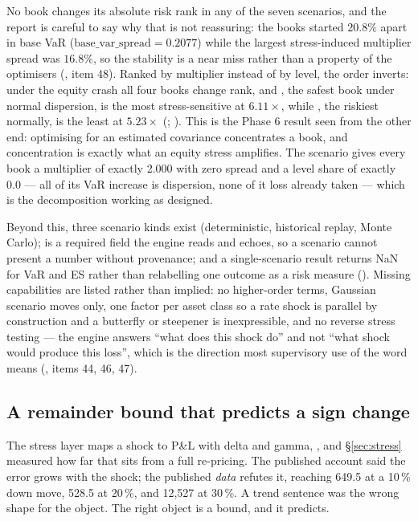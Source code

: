 \documentclass[11pt,a4paper]{article}
\begin{document}
No book changes its absolute risk rank in any of the seven scenarios, and the report is careful
to say why that is not reassuring: the books started $20.8\%$ apart in base VaR
($\text{base\_var\_spread} = 0.2077$) while the largest stress-induced multiplier spread was
$16.8\%$, so the stability is a near miss rather than a property of the optimisers
(, item 48). Ranked by multiplier instead of by level, the order
inverts: under the equity crash all four books change rank, and , the
safest book under normal dispersion, is the most stress-sensitive at $6.11\times$, while
, the riskiest normally, is the least at $5.23\times$
(; ). This
is the Phase 6 result seen from the other end: optimising for an estimated covariance
concentrates a book, and concentration is exactly what an equity stress amplifies. The
 scenario gives every book a multiplier of exactly 2.000 with zero spread and a
level share of exactly 0.0 --- all of its VaR increase is dispersion, none of it loss already
taken --- which is the decomposition working as designed.

Beyond this, three scenario kinds exist (deterministic, historical replay, Monte Carlo);
 is a required field the engine reads and echoes, so a scenario cannot present
a number without provenance; and a single-scenario result returns NaN for VaR and ES rather than
relabelling one outcome as a risk measure ().
Missing capabilities are listed rather than implied: no higher-order terms, Gaussian scenario
moves only, one factor per asset class so a rate shock is parallel by construction and a
butterfly or steepener is inexpressible, and no reverse stress testing --- the engine answers
``what does this shock do'' and not ``what shock would produce this loss'', which is the
direction most supervisory use of the word means (, items 44, 46, 47).

\subsection{A remainder bound that predicts a sign change}
\label{sec:bound}
The stress layer maps a shock to P\&L with delta and gamma, , and \S\ref{sec:stress} measured how far that sits from a full
re-pricing. The published account said the error grows with the shock; the published \emph{data}
refutes it, reaching 649.5 at a 10\,\% down move, 528.5 at 20\,\%, and 12{,}527 at 30\,\%. A trend
sentence was the wrong shape for the object. The right object is a bound, and it predicts.
\end{document}

